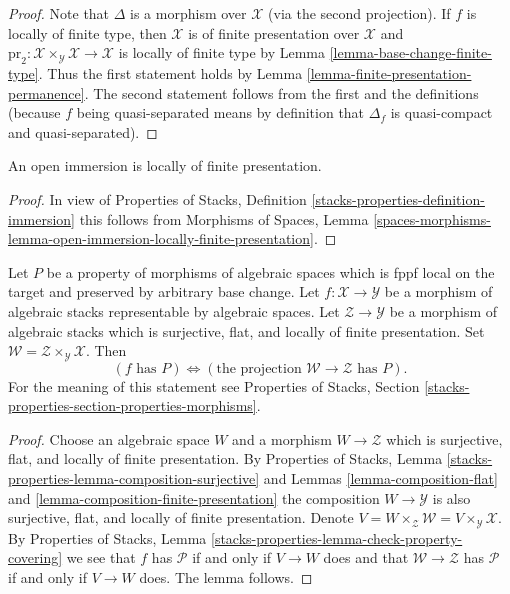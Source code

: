 \begin{proof}
Note that $\Delta$ is a morphism over $\mathcal{X}$ (via the second
projection). If $f$ is locally of finite type, then
$\mathcal{X}$ is of finite presentation over $\mathcal{X}$ and
$\text{pr}_2 : \mathcal{X} \times_\mathcal{Y} \mathcal{X} \to \mathcal{X}$
is locally of finite type by Lemma \ref{lemma-base-change-finite-type}.
Thus the first statement holds by
Lemma \ref{lemma-finite-presentation-permanence}.
The second statement follows from the first and
the definitions (because $f$ being quasi-separated means
by definition that $\Delta_f$ is quasi-compact and quasi-separated).
\end{proof}

\begin{lemma}
\label{lemma-open-immersion-locally-finite-presentation}
An open immersion is locally of finite presentation.
\end{lemma}

\begin{proof}
In view of Properties of Stacks, Definition
\ref{stacks-properties-definition-immersion}
this follows from
Morphisms of Spaces,
Lemma \ref{spaces-morphisms-lemma-open-immersion-locally-finite-presentation}.
\end{proof}

\begin{lemma}
\label{lemma-check-property-after-fppf-base-change}
Let $P$ be a property of morphisms of algebraic spaces which is
fppf local on the target and preserved by arbitrary base change.
Let $f : \mathcal{X} \to \mathcal{Y}$ be a morphism of algebraic stacks
representable by algebraic spaces.
Let $\mathcal{Z} \to \mathcal{Y}$ be a morphism of algebraic stacks which
is surjective, flat, and locally of finite presentation.
Set $\mathcal{W} = \mathcal{Z} \times_\mathcal{Y} \mathcal{X}$. Then
$$
(f\text{ has }P) \Leftrightarrow
(\text{the projection }\mathcal{W} \to \mathcal{Z}\text{ has }P).
$$
For the meaning of this statement see
Properties of Stacks, Section
\ref{stacks-properties-section-properties-morphisms}.
\end{lemma}

\begin{proof}
Choose an algebraic space $W$ and a morphism
$W \to \mathcal{Z}$ which is surjective, flat, and locally of finite
presentation. By
Properties of Stacks, Lemma
\ref{stacks-properties-lemma-composition-surjective}
and Lemmas \ref{lemma-composition-flat} and
\ref{lemma-composition-finite-presentation}
the composition $W \to \mathcal{Y}$ is also surjective, flat, and
locally of finite presentation. Denote
$V = W \times_\mathcal{Z} \mathcal{W} = V \times_\mathcal{Y} \mathcal{X}$.
By Properties of Stacks, Lemma
\ref{stacks-properties-lemma-check-property-covering}
we see that $f$ has $\mathcal{P}$ if and only if $V \to W$ does
and that $\mathcal{W} \to \mathcal{Z}$ has $\mathcal{P}$ if and only
if $V \to W$ does. The lemma follows.
\end{proof}

